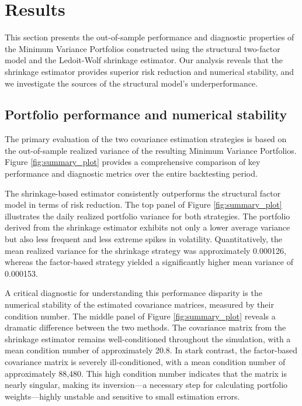 \documentclass[]{article}
\begin{document}
\section{Results}
\label{sec:results}
This section presents the out-of-sample performance and diagnostic properties of the Minimum Variance Portfolios constructed using the structural two-factor model and the Ledoit-Wolf shrinkage estimator. Our analysis reveals that the shrinkage estimator provides superior risk reduction and numerical stability, and we investigate the sources of the structural model's underperformance.

\subsection{Portfolio performance and numerical stability}
The primary evaluation of the two covariance estimation strategies is based on the out-of-sample realized variance of the resulting Minimum Variance Portfolios. Figure \ref{fig:summary_plot} provides a comprehensive comparison of key performance and diagnostic metrics over the entire backtesting period.

The shrinkage-based estimator consistently outperforms the structural factor model in terms of risk reduction. The top panel of Figure \ref{fig:summary_plot} illustrates the daily realized portfolio variance for both strategies. The portfolio derived from the shrinkage estimator exhibits not only a lower average variance but also less frequent and less extreme spikes in volatility. Quantitatively, the mean realized variance for the shrinkage strategy was approximately 0.000126, whereas the factor-based strategy yielded a significantly higher mean variance of 0.000153.

A critical diagnostic for understanding this performance disparity is the numerical stability of the estimated covariance matrices, measured by their condition number. The middle panel of Figure \ref{fig:summary_plot} reveals a dramatic difference between the two methods. The covariance matrix from the shrinkage estimator remains well-conditioned throughout the simulation, with a mean condition number of approximately 20.8. In stark contrast, the factor-based covariance matrix is severely ill-conditioned, with a mean condition number of approximately 88,480. This high condition number indicates that the matrix is nearly singular, making its inversion---a necessary step for calculating portfolio weights---highly unstable and sensitive to small estimation errors.
\end{document}
